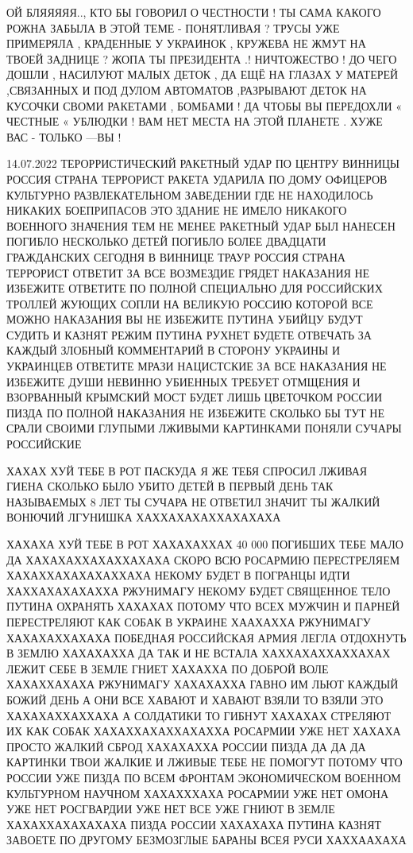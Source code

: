 ОЙ БЛЯЯЯЯЯ.., КТО БЫ ГОВОРИЛ О ЧЕСТНОСТИ ! ТЫ САМА КАКОГО РОЖНА ЗАБЫЛА В ЭТОЙ
ТЕМЕ - ПОНЯТЛИВАЯ ? ТРУСЫ УЖЕ ПРИМЕРЯЛА , КРАДЕННЫЕ У УКРАИНОК , КРУЖЕВА НЕ
ЖМУТ НА ТВОЕЙ ЗАДНИЦЕ ? ЖОПА ТЫ ПРЕЗИДЕНТА .! НИЧТОЖЕСТВО ! ДО ЧЕГО ДОШЛИ ,
НАСИЛУЮТ МАЛЫХ ДЕТОК , ДА ЕЩЁ НА ГЛАЗАХ У МАТЕРЕЙ ,СВЯЗАННЫХ И ПОД ДУЛОМ
АВТОМАТОВ ,РАЗРЫВАЮТ ДЕТОК НА КУСОЧКИ СВОМИ РАКЕТАМИ , БОМБАМИ ! ДА ЧТОБЫ ВЫ
ПЕРЕДОХЛИ « ЧЕСТНЫЕ « УБЛЮДКИ ! ВАМ НЕТ МЕСТА НА ЭТОЙ ПЛАНЕТЕ . ХУЖЕ ВАС -
ТОЛЬКО —ВЫ !

14.07.2022
ТЕРОРРИСТИЧЕСКИЙ РАКЕТНЫЙ УДАР ПО ЦЕНТРУ ВИННИЦЫ РОССИЯ СТРАНА ТЕРРОРИСТ РАКЕТА
УДАРИЛА ПО ДОМУ ОФИЦЕРОВ КУЛЬТУРНО РАЗВЛЕКАТЕЛЬНОМ ЗАВЕДЕНИИ ГДЕ НЕ НАХОДИЛОСЬ
НИКАКИХ БОЕПРИПАСОВ ЭТО ЗДАНИЕ НЕ ИМЕЛО НИКАКОГО ВОЕННОГО ЗНАЧЕНИЯ ТЕМ НЕ МЕНЕЕ
РАКЕТНЫЙ УДАР БЫЛ НАНЕСЕН ПОГИБЛО НЕСКОЛЬКО ДЕТЕЙ ПОГИБЛО БОЛЕЕ ДВАДЦАТИ
ГРАЖДАНСКИХ СЕГОДНЯ В ВИННИЦЕ ТРАУР РОССИЯ СТРАНА ТЕРРОРИСТ ОТВЕТИТ ЗА ВСЕ
ВОЗМЕЗДИЕ ГРЯДЕТ НАКАЗАНИЯ НЕ ИЗБЕЖИТЕ ОТВЕТИТЕ ПО ПОЛНОЙ СПЕЦИАЛЬНО ДЛЯ
РОССИЙСКИХ ТРОЛЛЕЙ ЖУЮЩИХ СОПЛИ НА ВЕЛИКУЮ РОССИЮ КОТОРОЙ ВСЕ МОЖНО НАКАЗАНИЯ
ВЫ НЕ ИЗБЕЖИТЕ ПУТИНА УБИЙЦУ БУДУТ СУДИТЬ И КАЗНЯТ РЕЖИМ ПУТИНА РУХНЕТ БУДЕТЕ
ОТВЕЧАТЬ ЗА КАЖДЫЙ ЗЛОБНЫЙ КОММЕНТАРИЙ В СТОРОНУ УКРАИНЫ И УКРАИНЦЕВ ОТВЕТИТЕ
МРАЗИ НАЦИСТСКИЕ ЗА ВСЕ НАКАЗАНИЯ НЕ ИЗБЕЖИТЕ ДУШИ НЕВИННО УБИЕННЫХ ТРЕБУЕТ
ОТМЩЕНИЯ И ВЗОРВАННЫЙ КРЫМСКИЙ МОСТ БУДЕТ ЛИШЬ ЦВЕТОЧКОМ РОССИИ ПИЗДА ПО ПОЛНОЙ
НАКАЗАНИЯ НЕ ИЗБЕЖИТЕ СКОЛЬКО БЫ ТУТ НЕ СРАЛИ СВОИМИ ГЛУПЫМИ ЛЖИВЫМИ КАРТИНКАМИ
ПОНЯЛИ СУЧАРЫ РОССИЙСКИЕ

ХАХАХ ХУЙ ТЕБЕ В РОТ ПАСКУДА Я ЖЕ ТЕБЯ СПРОСИЛ ЛЖИВАЯ ГИЕНА СКОЛЬКО БЫЛО УБИТО
ДЕТЕЙ В ПЕРВЫЙ ДЕНЬ ТАК НАЗЫВАЕМЫХ 8 ЛЕТ ТЫ СУЧАРА НЕ ОТВЕТИЛ ЗНАЧИТ ТЫ ЖАЛКИЙ
ВОНЮЧИЙ ЛГУНИШКА ХАХХАХАХАХХАХАХАХА

ХАХАХА ХУЙ ТЕБЕ В РОТ ХАХАХАХХАХ 40 000 ПОГИБШИХ ТЕБЕ МАЛО ДА
ХАХАХАХХАХАХХАХАХА СКОРО ВСЮ РОСАРМИЮ ПЕРЕСТРЕЛЯЕМ ХАХАХХАХАХАХАХХАХА НЕКОМУ
БУДЕТ В ПОГРАНЦЫ ИДТИ ХАХХАХАХАХАХХА РЖУНИМАГУ НЕКОМУ БУДЕТ СВЯЩЕННОЕ ТЕЛО ПУТИНА 
ОХРАНЯТЬ ХАХАХАХ ПОТОМУ ЧТО ВСЕХ МУЖЧИН И ПАРНЕЙ ПЕРЕСТРЕЛЯЮТ КАК СОБАК В УКРАИНЕ
ХААХАХХА РЖУНИМАГУ ХАХАХАХХАХАХА ПОБЕДНАЯ РОССИЙСКАЯ АРМИЯ ЛЕГЛА ОТДОХНУТЬ В ЗЕМЛЮ
ХАХАХАХХА ДА ТАК И НЕ ВСТАЛА ХАХХАХАХХАХХАХАХ ЛЕЖИТ СЕБЕ В ЗЕМЛЕ ГНИЕТ ХАХАХХА
ПО ДОБРОЙ ВОЛЕ ХАХАХХАХАХА РЖУНИМАГУ ХАХАХАХХА ГАВНО ИМ ЛЬЮТ КАЖДЫЙ БОЖИЙ ДЕНЬ
А ОНИ ВСЕ ХАВАЮТ И ХАВАЮТ ВЗЯЛИ ТО ВЗЯЛИ ЭТО ХАХАХАХХАХХАХА А СОЛДАТИКИ ТО ГИБНУТ ХАХАХАХ
СТРЕЛЯЮТ ИХ КАК СОБАК ХАХАХХАХАХХАХАХХА РОСАРМИИ УЖЕ НЕТ ХАХАХА ПРОСТО ЖАЛКИЙ СБРОД ХАХАХАХХА
РОССИИ ПИЗДА ДА ДА ДА КАРТИНКИ ТВОИ ЖАЛКИЕ И ЛЖИВЫЕ ТЕБЕ НЕ ПОМОГУТ ПОТОМУ ЧТО 
РОССИИ УЖЕ ПИЗДА ПО ВСЕМ ФРОНТАМ ЭКОНОМИЧЕСКОМ ВОЕННОМ КУЛЬТУРНОМ НАУЧНОМ ХАХАХХХАХА
РОСАРМИИ УЖЕ НЕТ ОМОНА УЖЕ НЕТ РОСГВАРДИИ УЖЕ НЕТ ВСЕ УЖЕ ГНИЮТ В ЗЕМЛЕ ХАХАХХАХАХАХАХА
ПИЗДА РОССИИ ХАХАХАХА ПУТИНА КАЗНЯТ ЗАВОЕТЕ ПО ДРУГОМУ БЕЗМОЗГЛЫЕ БАРАНЫ ВСЕЯ РУСИ ХАХХААХАХА

